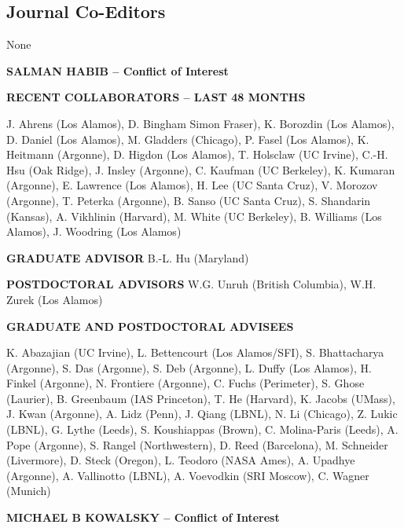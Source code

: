 \documentclass[11pt]{article}
\begin{document}
\subsection*{Journal Co-Editors} None

\newpage


\begin{center}
{\large{\bf SALMAN HABIB -- Conflict of Interest}} \\
\end{center}

\vspace{.2 true in}
{\bf RECENT COLLABORATORS -- LAST 48 MONTHS}

\vspace{.075 true in} 
J. Ahrens (Los Alamos), D. Bingham Simon Fraser), K. Borozdin (Los
Alamos), D. Daniel (Los Alamos), M. Gladders (Chicago), P. Fasel (Los
Alamos), K. Heitmann (Argonne), D. Higdon (Los Alamos), T. Holsclaw
(UC Irvine), C.-H. Hsu (Oak Ridge), J. Insley (Argonne), C. Kaufman
(UC Berkeley), K. Kumaran (Argonne), E. Lawrence (Los Alamos), H. Lee
(UC Santa Cruz), V. Morozov (Argonne), T. Peterka (Argonne), B. Sanso
(UC Santa Cruz), S. Shandarin (Kansas), A. Vikhlinin (Harvard),
M. White (UC Berkeley), B. Williams (Los Alamos), J. Woodring (Los
Alamos)

\vspace{.2 true in}
{\bf GRADUATE ADVISOR}
B.-L. Hu (Maryland)

\vspace{.2 true in}
{\bf POSTDOCTORAL ADVISORS}
W.G. Unruh (British Columbia), W.H. Zurek (Los Alamos)

\vspace{.2 true in}
{\bf GRADUATE AND POSTDOCTORAL ADVISEES}

\vspace{.075 true in}
K. Abazajian (UC Irvine), L. Bettencourt (Los Alamos/SFI),
S. Bhattacharya (Argonne), S. Das (Argonne), S. Deb (Argonne),
L. Duffy (Los Alamos), H. Finkel (Argonne), N. Frontiere (Argonne),
C. Fuchs (Perimeter), S. Ghose (Laurier), B. Greenbaum (IAS
Princeton), T. He (Harvard), K. Jacobs (UMass), J. Kwan (Argonne),
A. Lidz (Penn), J. Qiang (LBNL), N. Li (Chicago), Z. Lukic (LBNL),
G. Lythe (Leeds), S. Koushiappas (Brown), C. Molina-Paris (Leeds),
A. Pope (Argonne), S. Rangel (Northwestern), D. Reed (Barcelona),
M. Schneider (Livermore), D. Steck (Oregon), L. Teodoro (NASA Ames),
A. Upadhye (Argonne), A. Vallinotto (LBNL), A. Voevodkin (SRI Moscow),
C. Wagner (Munich)


\newpage
\begin{center}
{\large{\bf MICHAEL B KOWALSKY -- Conflict of Interest}} \\
\end{center}
\end{document}

